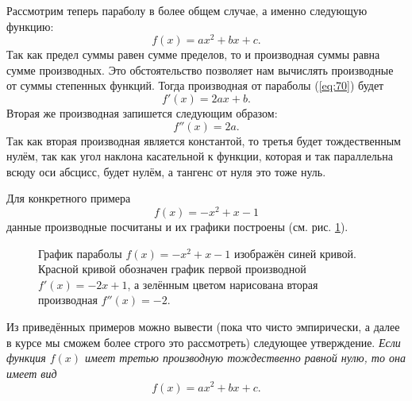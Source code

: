 \documentclass[12pt]{article}
\begin{document}
Рассмотрим теперь параболу в более общем случае, а именно следующую функцию:
\begin{equation}\label{eq:70}
	f(x)=ax^2+bx+c.
\end{equation}
Так как предел суммы равен сумме пределов, то и производная суммы равна сумме производных. Это обстоятельство позволяет нам вычислять производные от суммы степенных функций. Тогда производная от параболы (\ref{eq:70}) будет
\begin{equation}
	f'(x)=2ax+b.
\end{equation}
Вторая же производная запишется следующим образом:
\begin{equation}
	f''(x)=2a.
\end{equation}
Так как вторая производная является константой, то третья будет тождественным нулём, так как угол наклона касательной к функции, которая и так параллельна всюду оси абсцисс, будет нулём, а тангенс от нуля это тоже нуль.

Для конкретного примера 
\begin{equation}
	f(x) = -x^2 + x - 1
\end{equation}
данные производные посчитаны и их графики построены (см. рис. \ref{fig:70}).

\begin{figure}[htbp]
\centering
{}
\caption{График параболы $f(x) = -x^2 + x - 1$ изображён синей кривой. Красной кривой обозначен график первой производной $f'(x) = -2x+1$, а зелённым цветом нарисована вторая производная $f''(x) = -2$.}
\label{fig:70}
\end{figure}

Из приведённых примеров можно вывести (пока что чисто эмпирически, а далее в курсе мы сможем более строго это рассмотреть) следующее утверждение. \emph{Если функция $f(x)$ имеет третью производную тождественно равной нулю, то она имеет вид} 
\begin{equation}
	f(x)=ax^2+bx+c.
\end{equation}
\end{document}
